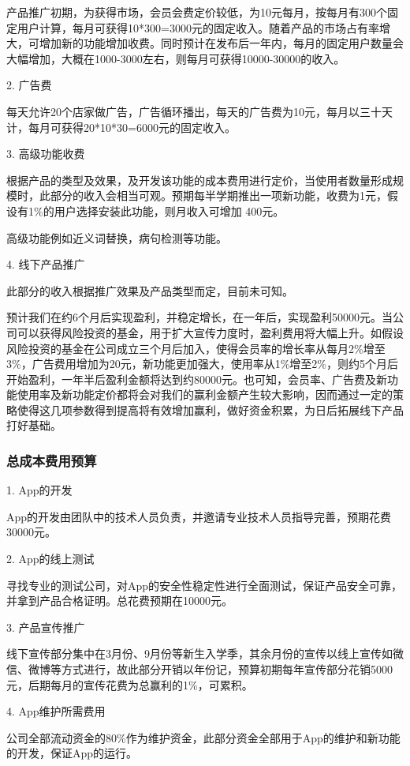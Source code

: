 \documentclass[10pt,letterpaper]{article}
\begin{document}
产品推广初期，为获得市场，会员会费定价较低，为10元每月，按每月有300个固定用户计算，每月可获得10*300=3000元的固定收入。随着产品的市场占有率增大，可增加新的功能增加收费。同时预计在发布后一年内，每月的固定用户数量会大幅增加，大概在1000-3000左右，则每月可获得10000-30000的收入。

2. 广告费

每天允许20个店家做广告，广告循环播出，每天的广告费为10元，每月以三十天计，每月可获得20*10*30=6000元的固定收入。

3. 高级功能收费

根据产品的类型及效果，及开发该功能的成本费用进行定价，当使用者数量形成规模时，此部分的收入会相当可观。预期每半学期推出一项新功能，收费为1元，假设有1\%的用户选择安装此功能，则月收入可增加 400元。

高级功能例如近义词替换，病句检测等功能。

4. 线下产品推广

此部分的收入根据推广效果及产品类型而定，目前未可知。

预计我们在约6个月后实现盈利，并稳定增长，在一年后，实现盈利50000元。当公司可以获得风险投资的基金，用于扩大宣传力度时，盈利费用将大幅上升。如假设风险投资的基金在公司成立三个月后加入，使得会员率的增长率从每月2\%增至3\%，广告费用增加为20元，新功能更加强大，使用率从1\%增至2\%，则约5个月后开始盈利，一年半后盈利金额将达到约80000元。也可知，会员率、广告费及新功能使用率及新功能定价都将会对我们的赢利金额产生较大影响，因而通过一定的策略使得这几项参数得到提高将有效增加赢利，做好资金积累，为日后拓展线下产品打好基础。

\subsubsection{总成本费用预算}
1. App的开发

App的开发由团队中的技术人员负责，并邀请专业技术人员指导完善，预期花费30000元。

2. App的线上测试

寻找专业的测试公司，对App的安全性稳定性进行全面测试，保证产品安全可靠，并拿到产品合格证明。总花费预期在10000元。

3. 产品宣传推广

线下宣传部分集中在3月份、9月份等新生入学季，其余月份的宣传以线上宣传如微信、微博等方式进行，故此部分开销以年份记，预算初期每年宣传部分花销5000元，后期每月的宣传花费为总赢利的1\%，可累积。

4. App维护所需费用

公司全部流动资金的80\%作为维护资金，此部分资金全部用于App的维护和新功能的开发，保证App的运行。
\end{document}
